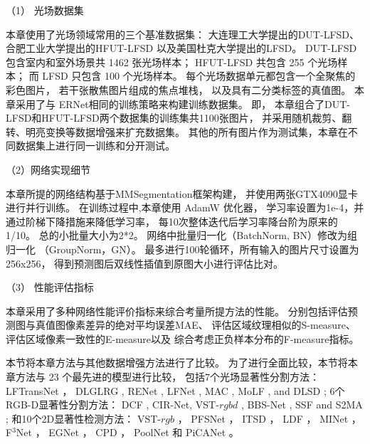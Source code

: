 


（1）
光场数据集


本章使用了光场领域常用的三个基准数据集：
大连理工大学提出的DUT-LFSD、
合肥工业大学提出的HFUT-LFSD
以及美国杜克大学提出的LFSD。
DUT-LFSD 包含室内和室外场景共 1462 张光场样本；
HFUT-LFSD 共包含 255 个光场样本；
而 LFSD 只包含 100 个光场样本。
每个光场数据单元都包含一个全聚焦的彩色图片，
若干张散焦图片组成的焦点堆栈，
以及具有二分类标签的真值图。
本章采用了与 ERNet相同的训练策略来构建训练数据集。
即，
本章组合了DUT-LFSD和HFUT-LFSD两个数据集的训练集共1100张图片，
并采用随机裁剪、翻转、明亮变换等数据增强来扩充数据集。
其他的所有图片作为测试集，本章在不同数据集上进行同一训练和分开测试。



（2）网络实现细节


本章所提的网络结构基于MMSegmentation框架构建，
并使用两张GTX4090显卡进行并行训练。
在训练过程中,本章使用 AdamW 优化器，
学习率设置为1e-4，并通过阶梯下降措施来降低学习率，
每10次整体迭代后学习率降台阶为原来的1/10。
总的小批量大小为2*2。
网络中批量归一化（BatchNorm, BN）修改为组
归一化 （GroupNorm，GN）。
最多进行100轮循环，所有输入的图片尺寸设置为 256x256，
得到预测图后双线性插值到原图大小进行评估比对。



（3）
性能评估指标


本章采用了多种网络性能评价指标来综合考量所提方法的性能。
分别包括评估预测图与真值图像素差异的绝对平均误差MAE、
评估区域纹理相似的S-measure、
评估区域像素一致性的E-measure以及
综合考虑正负样本分布的F-measure指标。











本节将本章方法与其他数据增强方法进行了比较。
为了进行全面比较，本节将本章方法与 23 个最先进的模型进行比较，
包括7个光场显著性分割方法：
LFTransNet ，
DLGLRG , RENet , LFNet ,
MAC , MoLF , and DLSD ;
%
%
%
%
6个RGB-D显著性分割方法：
DCF , CIR-Net, VST-$rgbd$  ,
BBS-Net     , SSF and S2MA    ;
%
%
%
%
%
和10个2D显著性检测方法：
VST-$rgb$ ，
PFSNet ，
ITSD ，
LDF ，
MINet ，
F$^{3}$Net  ， 
EGNet   ，
CPD  ，
PoolNet 和
PiCANet 。


